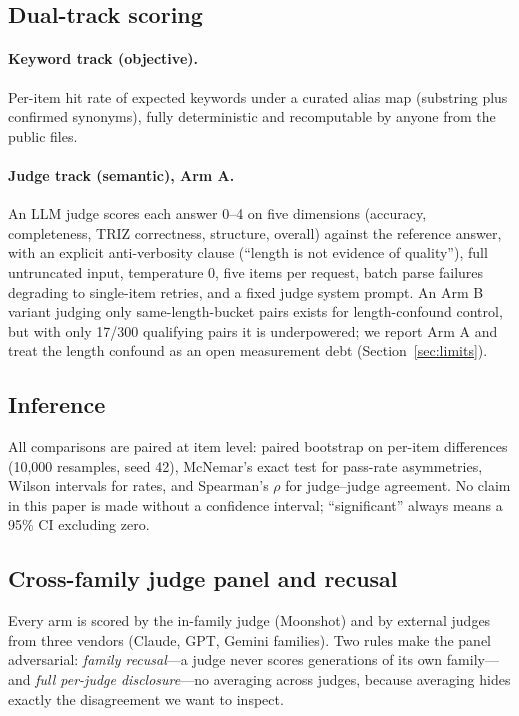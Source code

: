 \documentclass[11pt]{article}
\begin{document}
\subsection{Dual-track scoring}
\paragraph{Keyword track (objective).} Per-item hit rate of expected
keywords under a curated alias map (substring plus confirmed synonyms),
fully deterministic and recomputable by anyone from the public files.

\paragraph{Judge track (semantic), Arm A.} An LLM judge scores each
answer 0--4 on five dimensions (accuracy, completeness, TRIZ
correctness, structure, overall) against the reference answer, with an
explicit anti-verbosity clause (``length is not evidence of quality''),
full untruncated input, temperature 0, five items per request, batch
parse failures degrading to single-item retries, and a fixed judge
system prompt. An Arm B variant judging only same-length-bucket pairs
exists for length-confound control, but with only 17/300 qualifying
pairs it is underpowered; we report Arm A and treat the length confound
as an open measurement debt (Section~\ref{sec:limits}).

\subsection{Inference}
All comparisons are paired at item level: paired bootstrap on per-item
differences (10{,}000 resamples, seed 42), McNemar's exact test for
pass-rate asymmetries, Wilson intervals for rates, and Spearman's
$\rho$ for judge--judge agreement. No claim in this paper is made
without a confidence interval; ``significant'' always means a 95\% CI
excluding zero.

\subsection{Cross-family judge panel and recusal}
Every arm is scored by the in-family judge (Moonshot) and by external
judges from three vendors (Claude, GPT, Gemini families). Two rules
make the panel adversarial: \emph{family recusal}---a judge never
scores generations of its own family---and \emph{full per-judge
disclosure}---no averaging across judges, because averaging hides
exactly the disagreement we want to inspect.
\end{document}
